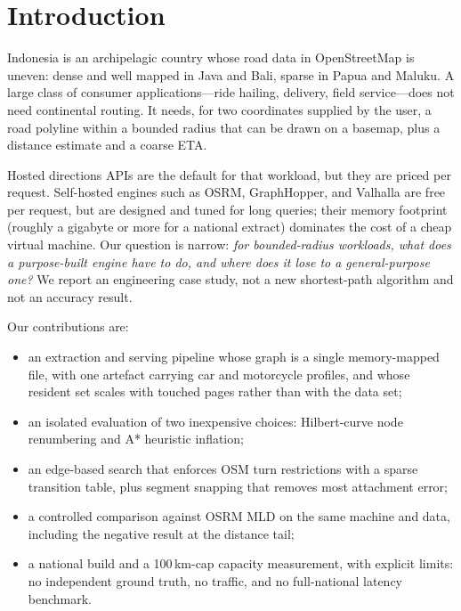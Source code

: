 \documentclass[sigconf,nonacm]{acmart}
\begin{document}
\section{Introduction}
Indonesia is an archipelagic country whose road data in OpenStreetMap is uneven:
dense and well mapped in Java and Bali, sparse in Papua and Maluku. A large class
of consumer applications---ride hailing, delivery, field service---does not need
continental routing. It needs, for two coordinates supplied by the user, a road
polyline within a bounded radius that can be drawn on a basemap, plus a distance
estimate and a coarse ETA.

Hosted directions APIs are the default for that workload, but they are priced per
request. Self-hosted engines such as OSRM, GraphHopper, and Valhalla are free per
request, but are designed and tuned for long queries; their memory footprint
(roughly a gigabyte or more for a national extract) dominates the cost of a cheap
virtual machine. Our question is narrow: \emph{for bounded-radius workloads, what
does a purpose-built engine have to do, and where does it lose to a
general-purpose one?} We report an engineering case study, not a new shortest-path
algorithm and not an accuracy result.

Our contributions are:
\begin{itemize}
  \item an extraction and serving pipeline whose graph is a single memory-mapped
        file, with one artefact carrying car and motorcycle profiles, and whose
        resident set scales with touched pages rather than with the data set;
  \item an isolated evaluation of two inexpensive choices: Hilbert-curve node
        renumbering and A* heuristic inflation;
  \item an edge-based search that enforces OSM turn restrictions with a sparse
        transition table, plus segment snapping that removes most attachment
        error;
  \item a controlled comparison against OSRM MLD on the same machine and data,
        including the negative result at the distance tail;
  \item a national build and a 100\,km-cap capacity measurement, with explicit
        limits: no independent ground truth, no traffic, and no full-national
        latency benchmark.
\end{itemize}
\end{document}
